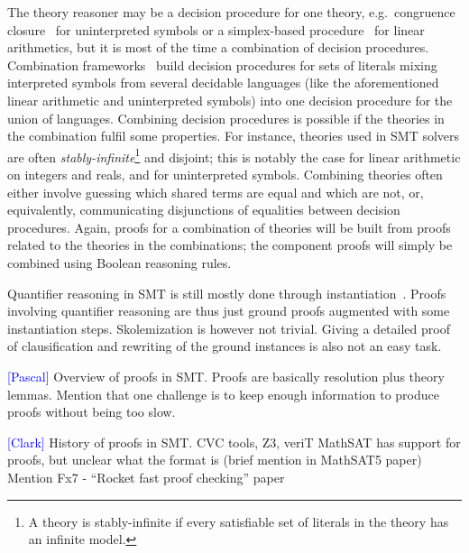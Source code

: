\documentclass{llncs}
\newcommand{\Note}[1]{\textcolor{blue}{[#1]}}
\begin{document}
The theory reasoner may be a decision procedure for one theory, e.g.\ congruence
closure~\cite{Nelson2,Nieuwenhuis6} for uninterpreted symbols or a simplex-based
procedure~\cite{Dutertre1} for linear arithmetics, but it is most of the time a
combination of decision procedures.  Combination
frameworks~\cite{Nelson3,Tinelli1} build decision procedures for sets of
literals mixing interpreted symbols from several decidable languages (like the
aforementioned linear arithmetic and uninterpreted symbols) into one decision
procedure for the union of languages.  Combining decision procedures is possible
if the theories in the combination fulfil some properties.  For instance,
theories used in SMT solvers are often \emph{stably-infinite}\footnote{A theory
  is stably-infinite if every satisfiable set of literals in the theory has an
  infinite model.} and disjoint; this is notably the case for linear arithmetic
on integers and reals, and for uninterpreted symbols.  Combining theories often
either involve guessing which shared terms are equal and which are not, or,
equivalently, communicating disjunctions of equalities between decision
procedures.  Again, proofs for a combination of theories will be built from
proofs related to the theories in the combinations; the component proofs will
simply be combined using Boolean reasoning rules.

Quantifier reasoning in SMT is still mostly done through
instantiation~\cite{Moura9}.  Proofs involving quantifier reasoning are thus
just ground proofs augmented with some instantiation steps.  Skolemization is
however not trivial.  Giving a detailed proof of clausification and rewriting of
the ground instances is also not an easy task.



\Note{Pascal}
Overview of proofs in SMT.  Proofs are basically resolution plus theory
lemmas.  Mention that one challenge is to keep enough information to produce
proofs without being too slow.

\Note{Clark}
History of proofs in SMT.  CVC tools, Z3, veriT
MathSAT has support for proofs, but unclear what the format is (brief mention
in MathSAT5 paper)
Mention Fx7 - ``Rocket fast proof checking'' paper
\end{document}
